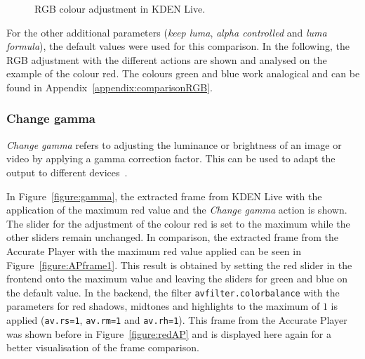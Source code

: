 \documentclass[../MasterThesis.tex]{subfiles}
\begin{document}
\begin{figure}[H]
	\begin{center}
		\caption[RGB colour adjustment in KDEN Live.]{RGB colour adjustment in KDEN Live.}
		\label{figure:kdenlive_rgb}
	\end{center}
\end{figure}

For the other additional parameters (\textit{keep luma}, \textit{alpha controlled} and \textit{luma formula}), the default values were used for this comparison. In the following, the RGB adjustment with the different actions are shown and analysed on the example of the colour red. The colours green and blue work analogical and can be found in Appendix~\ref{appendix:comparisonRGB}.












\subsubsection*{Change gamma}

\textit{Change gamma} refers to adjusting the luminance or brightness of an image or video by applying a gamma correction factor. This can be used to adapt the output to different devices~\cite{gamma}.

In Figure~\ref{figure:gamma}, the extracted frame from KDEN Live with the application of the maximum red value and the \textit{Change gamma} action is shown. The slider for the adjustment of the colour red is set to the maximum while the other sliders remain unchanged.
In comparison, the extracted frame from the Accurate Player with the maximum red value applied can be seen in Figure~\ref{figure:APframe1}. This result is obtained by setting the red slider in the frontend onto the maximum value and leaving the sliders for green and blue on the default value. In the backend, the filter \texttt{avfilter.colorbalance} with the parameters for red shadows, midtones and highlights to the maximum of $1$ is applied (\texttt{av.rs=1}, \texttt{av.rm=1} and \texttt{av.rh=1}).
This frame from the Accurate Player was shown before in Figure~\ref{figure:redAP} and is displayed here again for a better visualisation of the frame comparison.
\end{document}
